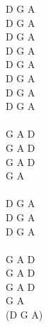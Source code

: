\documentclass[a5paper, 10pt]{book}
\begin{document}
\begin{minipage}[t]{0.3\textwidth}
  D G A   \\ %
  D G A \\
  D G A \\
  D G A \\
  D G A \\
  D G A \\
  D G A \\
  D G A \\
  \\
  G A D \\
  G A D \\
  G A D \\
  G A \\
  \\
  D G A \\
  D G A \\
  D G A \\
  \\
  G A D \\
  G A D \\
  G A D \\
  G A \\
  (D G A) \\

\end{minipage}

\newpage
\end{document}
